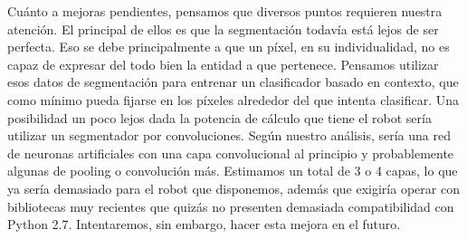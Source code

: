 \documentclass{article}
\begin{document}
	Cuánto a mejoras pendientes, pensamos que diversos puntos requieren nuestra atención. El principal de ellos es que la segmentación todavía está lejos de ser perfecta. Eso se debe principalmente a que un píxel, en su individualidad, no es capaz de expresar del todo bien la entidad a que pertenece. Pensamos utilizar esos datos de segmentación para entrenar un clasificador basado en contexto, que como mínimo pueda fijarse en los píxeles alrededor del que intenta clasificar. Una posibilidad un poco lejos dada la potencia de cálculo que tiene el robot sería utilizar un segmentador por convoluciones. Según nuestro análisis, sería una red de neuronas artificiales con una capa convolucional al principio y probablemente algunas de pooling o convolución más. Estimamos un total de 3 o 4 capas, lo que ya sería demasiado para el robot que disponemos, además que exigiría operar con bibliotecas muy recientes que quizás no presenten demasiada compatibilidad con Python 2.7. Intentaremos, sin embargo, hacer esta mejora en el futuro.








\end{document}
